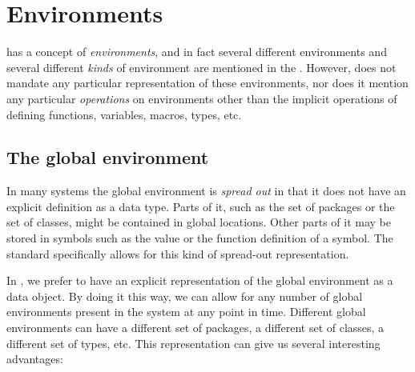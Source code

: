 \chapter{Environments}
\label{chap-environments}

\commonlisp{} has a concept of \emph{environments}, and in fact several
different environments and several different \emph{kinds} of
environment are mentioned in the \hs{}.  However, \commonlisp{} does not
mandate any particular representation of these environments, nor does
it mention any particular \emph{operations} on environments other than
the implicit operations of defining functions, variables, macros,
types, etc. 

\section{The global environment}
\label{sec-the-global-environment}

In many \commonlisp{} systems the global environment is \emph{spread
  out} in that it does not have an explicit definition as a data type.
Parts of it, such as the set of packages or the set of classes, might
be contained in global locations.  Other parts of it may be stored in
symbols such as the value or the function definition of a symbol.  The
standard specifically allows for this kind of spread-out
representation.

In \sysname{}, we prefer to have an explicit representation of the
global environment as a data object.  By doing it this way, we can
allow for any number of global environments present in the system at
any point in time.  Different global environments can have a different
set of packages, a different set of classes, a different set of types,
etc.  This representation can give us several interesting advantages: 

